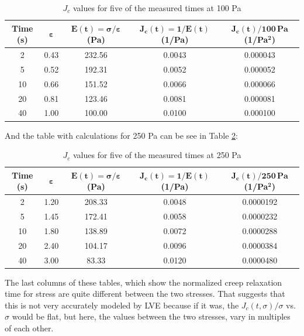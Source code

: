 \begin{table}[h!]
\centering
\caption{$J_c$ values for five of the measured times at 100 Pa}
\begin{tabular}{ccccc} \label{100Pa}
\textbf{Time (s)} & $\bm{\varepsilon}$ & $\mathbf{E(t) = \bm{\sigma} / \bm{\varepsilon}}$ \textbf{(Pa)} & $\mathbf{J_c (t) = 1/E(t)}$ \textbf{(1/Pa)} & $\mathbf{J_c (t) / 100} \,\textbf{Pa}$ \textbf{(1/Pa$\mathbf{^2}$)} \\
\hline\hline
2  & 0.43 & 232.56 & 0.0043 & 0.000043 \\
5  & 0.52 & 192.31 & 0.0052 & 0.000052 \\
10 & 0.66 & 151.52 & 0.0066 & 0.000066 \\
20 & 0.81 & 123.46 & 0.0081 & 0.000081 \\
40 & 1.00 & 100.00 & 0.0100 & 0.000100 \\
\end{tabular}
\end{table}

And the table with calculations for 250 Pa can be see in Table \ref{250Pa}:

\begin{table}[h!]
\centering
\caption{$J_c$ values for five of the measured times at 250 Pa}
\begin{tabular}{ccccc} \label{250Pa}
\textbf{Time (s)} & $\bm{\varepsilon}$ & $\mathbf{E(t) = \bm{\sigma} / \bm{\varepsilon}}$ \textbf{(Pa)} & $\mathbf{J_c (t) = 1/E(t)}$ \textbf{(1/Pa)} & $\mathbf{J_c (t) / 250} \,\textbf{Pa}$ \textbf{(1/Pa$\mathbf{^2}$)} \\
\hline\hline
2  & 1.20 & 208.33 & 0.0048 & 0.0000192 \\
5  & 1.45 & 172.41 & 0.0058 & 0.0000232 \\
10 & 1.80 & 138.89 & 0.0072 & 0.0000288 \\
20 & 2.40 & 104.17 & 0.0096 & 0.0000384 \\
40 & 3.00 & 83.33  & 0.0120 & 0.0000480 \\
\end{tabular}
\end{table}

The last columns of these tables, which show the normalized creep relaxation time for stress are quite different between the two stresses. That suggests that this is not very accurately modeled by LVE because if it was, the $J_c (t,\sigma) / \sigma$ vs. $\sigma$ would be flat, but here, the values between the two stresses, vary in multiples of each other.

